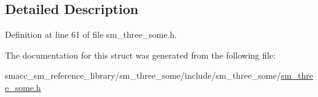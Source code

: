 \subsection{Detailed Description}


Definition at line 61 of file sm\+\_\+three\+\_\+some.\+h.



The documentation for this struct was generated from the following file\+:\begin{DoxyCompactItemize}
\item 
smacc\+\_\+sm\+\_\+reference\+\_\+library/sm\+\_\+three\+\_\+some/include/sm\+\_\+three\+\_\+some/\hyperlink{sm__three__some_8h}{sm\+\_\+three\+\_\+some.\+h}\end{DoxyCompactItemize}
